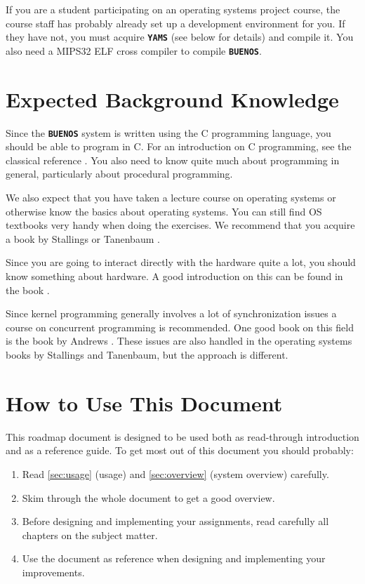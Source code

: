 \documentclass[twoside,a4paper]{report}
\newcommand{\buenos}{\texttt{\textbf{BUENOS}}}
\newcommand{\yams}{\texttt{\textbf{YAMS}}}
\begin{document}
If you are a student participating on an operating systems project
course, the course staff has probably already set up a development
environment for you. If they have not, you must acquire \yams{} (see
below for details) and compile it. You also need a MIPS32 ELF cross
compiler to compile \buenos{}.

\section{Expected Background Knowledge}

Since the \buenos{} system is written using the C programming
language, you should be able to program in C. For an introduction on C
programming, see the classical reference \cite{kandr}. You also need
to know quite much about programming in general, particularly about
procedural programming.

We also expect that you have taken a lecture course on operating
systems or otherwise know the basics about operating systems. You can
still find OS textbooks very handy when doing the exercises. We
recommend that you acquire a book by Stallings \cite{stallings} or
Tanenbaum \cite{tanenbaum}.

Since you are going to interact directly with the hardware quite a
lot, you should know something about hardware. A good introduction on
this can be found in the book \cite{patterson}.

Since kernel programming generally involves a lot of synchronization
issues a course on concurrent programming is recommended. One good
book on this field is the book by Andrews \cite{andrews}. These issues
are also handled in the operating systems books by Stallings and
Tanenbaum, but the approach is different.

\section{How to Use This Document}

This roadmap document is designed to be used both as read-through
introduction and as a reference guide. To get most out of this
document you should probably:

\begin{enumerate}

\item Read \autoref{sec:usage} (usage) and \autoref{sec:overview}
(system overview) carefully.

\item Skim through the whole document to get a good overview.

\item Before designing and implementing your assignments, read
carefully all chapters on the subject matter.

\item Use the document as reference when designing and implementing
your improvements.

\end{enumerate}
\end{document}
